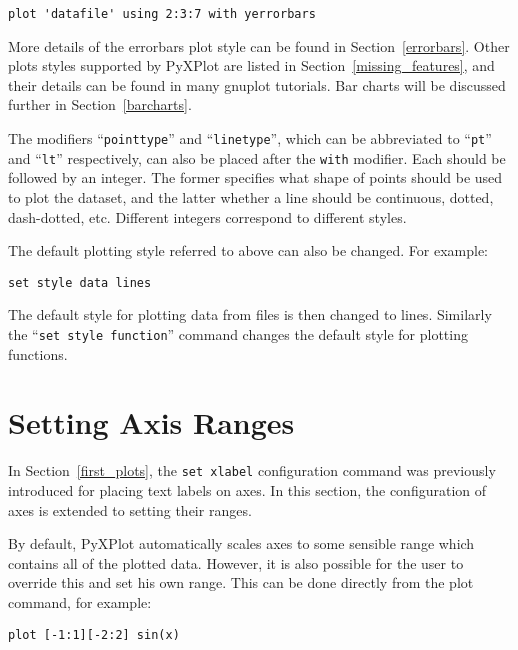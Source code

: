 \begin{verbatim}
plot 'datafile' using 2:3:7 with yerrorbars
\end{verbatim}

More details of the errorbars plot style can be found in
Section~\ref{errorbars}. Other plots styles supported by PyXPlot are listed in
Section~\ref{missing_features}, and their details can be found in many gnuplot
tutorials. Bar charts will be discussed further in Section~\ref{barcharts}.

The modifiers ``\texttt{pointtype}'' and ``\texttt{linetype}''\label{pointtype_modifier}, which can be
abbreviated to ``\texttt{pt}'' and ``\texttt{lt}'' respectively, can also be
placed after the \texttt{with} modifier. Each should be followed by an integer.
The former specifies what shape of points should be used to plot the dataset,
and the latter whether a line should be continuous, dotted, dash-dotted, etc.
Different integers correspond to different styles.

The default plotting style referred to above can also be changed.  For example:

\begin{verbatim}
set style data lines
\end{verbatim}

\noindent The default style for plotting data from files is then changed to
lines.  Similarly the ``{\tt set style function}'' command changes the default style for
plotting functions.

\section{Setting Axis Ranges}

In Section~\ref{first_plots}, the \texttt{set xlabel} configuration command was
previously introduced for placing text labels on axes. In this section, the
configuration of axes is extended to setting their ranges.

By default, PyXPlot automatically scales axes to some sensible range which
contains all of the plotted data. However, it is also possible for the user to
override this and set his own range. This can be
done directly from the plot command, for example:

\begin{verbatim}
plot [-1:1][-2:2] sin(x)
\end{verbatim}
\label{plot_ranges}

